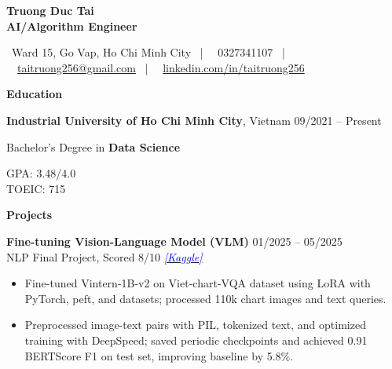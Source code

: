 \documentclass[10pt]{article}
\begin{document}
\begin{center}
    {\large \textbf{Truong Duc Tai}} \\
    \textbf{AI/Algorithm Engineer}
\end{center}

\begin{center}
    \footnotesize
    \faMapMarker \ Ward 15, Go Vap, Ho Chi Minh City \ | \ 
    \faPhone \ 0327341107 \ | \ 
    \faEnvelope \ \href{mailto:taitruong256@gmail.com}{taitruong256@gmail.com} \ | \ 
    \faLinkedin \ \href{https://www.linkedin.com/in/taitruong256}{linkedin.com/in/taitruong256}
\end{center}

\begin{center}
    \vspace{0.05cm}
    \hrulefill
    \vspace{0.05cm}
\end{center}

\begin{center}
    \textbf{Education}
\end{center}

\textbf{Industrial University of Ho Chi Minh City}, Vietnam \hfill 09/2021 -- Present \\
\begin{minipage}[t]{0.65\textwidth}
    Bachelor’s Degree in \textbf{Data Science}
\end{minipage}%
\begin{minipage}[t]{0.35\textwidth}
    \raggedleft
    GPA: 3.48/4.0 \\
    TOEIC: 715
\end{minipage}

\begin{center}
    \vspace{0.05cm}
    \hrulefill
    \vspace{0.05cm}
\end{center}

\begin{center}
    \textbf{Projects}
\end{center}

\textbf{Fine-tuning Vision-Language Model (VLM)} \hfill 01/2025 -- 05/2025 \\
NLP Final Project, Scored 8/10 \hfill \href{https://www.kaggle.com/code/taitruong256/fine-tuned-vintern-1b-v2-chart-vqa}{\textcolor{blue}{\textit{[Kaggle]}}}

\begin{itemize}[noitemsep, topsep=0pt, partopsep=0pt, parsep=0pt]
    \item Fine-tuned Vintern-1B-v2 on Viet-chart-VQA dataset using LoRA with PyTorch, peft, and datasets; processed 110k chart images and text queries.
    \item Preprocessed image-text pairs with PIL, tokenized text, and optimized training with DeepSpeed; saved periodic checkpoints and achieved 0.91 BERTScore F1 on test set, improving baseline by 5.8\%.
\end{itemize}
\end{document}
